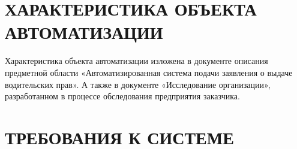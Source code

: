 \documentclass[russian, utf8, 12pt,pointsubsection,floatsubsection]{eskdtext}
\begin{document}
\section{ХАРАКТЕРИСТИКА ОБЪЕКТА АВТОМАТИЗАЦИИ}


Характеристика объекта автоматизации изложена в документе описания предметной области «Автоматизированная система подачи заявления о выдаче водительских прав». А также в документе «Исследование организации», разработанном в процессе обследования предприятия заказчика.



\section{ТРЕБОВАНИЯ К СИСТЕМЕ}
\end{document}
